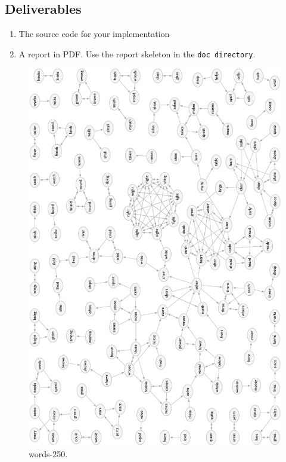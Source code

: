 \documentclass{tufte-handout}
\begin{document}
\subsection{Deliverables}

\begin{enumerate}
  \item The source code for your implementation
  \item A report in PDF.
  Use the report skeleton in the {\tt doc directory}.
  \end{enumerate}

\newpage
\begin{figure}
\includegraphics{words-250-layout.pdf}
\caption{words-250.}
\end{figure}
\end{document}
